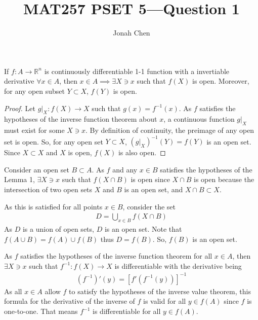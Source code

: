 \documentclass{exam}
\title{MAT257 PSET 5---Question 1}
\author{Jonah Chen}
\numberwithin{equation}{section}
\newcommand{\R}{\mathbb{R}}
\begin{document}
    \sffamily
    \maketitle
    \begin{lemma}
        If $f:A\to\R^n$ is continuously differentiable 1-1 function with a invertiable derivative $\forall x\in A$, then $x\in A\implies\exists X\ni x$ such that $f(X)$ is open. Moreover, for any open subset $Y\subset X$, $f(Y)$ is open.

        \begin{proof}
            Let $g|_X:f(X)\to X$ such that $g(x)=f^{-1}(x)$. As $f$ satisfies the hypotheses of the inverse function theorem about $x$, a continuous function $g|_X$ must exist for some $X\ni x$. By definition of continuity, the preimage of any open set is open. So, for any open set $Y\subset X$, $(g|_X)^{-1}(Y)=f(Y)$ is an open set. Since $X\subset X$ and $X$ is open, $f(X)$ is also open. 
        \end{proof}
    \end{lemma}

    Consider an open set $B\subset A$. As $f$ and any $x\in B$ satisfies the hypotheses of the Lemma 1, $\exists X\ni x$ such that $f(X\cap B)$ is open since $X\cap B$ is open because the intersection of two open sets $X$ and $B$ is an open set, and $X\cap B\subset X$.

    As this is satisfied for all points $x\in B$, consider the set
    \begin{align*}
        D=\bigcup_{x\in B}f(X\cap B)
    \end{align*}
    As $D$ is a union of open sets, $D$ is an open set. Note that $f(A\cup B)=f(A)\cup f(B)$ thus $D=f(B)$. So, $f(B)$ is an open set.

    As $f$ satisfies the hypotheses of the inverse function theorem for all $x\in A$, then $\exists X\ni x$ such that $f^{-1}:f(X)\to X$ is differentiable with the derivative being 
    \begin{align*}
        (f^{-1})'(y)=[f'(f^{-1}(y))]^{-1}
    \end{align*}
    As all $x\in A$ allow $f$ to satisfy the hypotheses of the inverse value theorem, this formula for the derivative of the inverse of $f$ is valid for all $y\in f(A)$ since $f$ is one-to-one. That means $f^{-1}$ is differentiable for all $y\in f(A)$.
\end{document}
